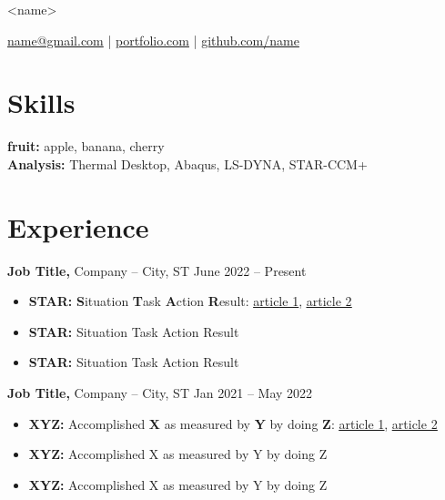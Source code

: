 \documentclass[11pt]{article}       %
\begin{document}
\centerline{\Huge <name>}

\vspace{5pt}

\centerline{\href{mailto:name@gmail.com}{name@gmail.com} | \href{https://mitcommlab.mit.edu/meche/commkit/portfolio/}{portfolio.com} | \href{https://old.reddit.com/r/EngineeringResumes/wiki/index\#wiki_portfolios}{github.com/name}}

\vspace{-10pt}

\section*{Skills}
\textbf{fruit:} apple, banana, cherry \\


\textbf{Analysis:} Thermal Desktop, Abaqus, LS-DYNA, STAR-CCM+

\vspace{-6.5pt}

\section*{Experience}
\textbf{Job Title,} {Company} -- City, ST \hfill June 2022 -- Present \\
\vspace{-9pt}
\begin{itemize}
  \item \textbf{STAR:} \textbf{S}ituation \textbf{T}ask \textbf{A}ction \textbf{R}esult: \href{https://www.levels.fyi/blog/applying-star-method-resumes.html}{\underline{article 1}}, \href{https://resumegenius.com/blog/resume-help/star-method-resume}{\underline{article 2}}
  \item \textbf{STAR:} Situation Task Action Result
  \item \textbf{STAR:} Situation Task Action Result
\end{itemize}

\textbf{Job Title,} {Company} -- City, ST \hfill Jan 2021 -- May 2022 \\
\vspace{-9pt}
\begin{itemize}
  \item \textbf{XYZ:} Accomplished \textbf{X} as measured by \textbf{Y} by doing \textbf{Z}: \href{https://www.inc.com/bill-murphy-jr/google-recruiters-say-these-5-resume-tips-including-x-y-z-formula-will-improve-your-odds-of-getting-hired-at-google.html}{\underline{article 1}}, \href{https://elevenrecruiting.com/create-an-effective-resume-xyz-resume-format/}{\underline{article 2}}
  \item \textbf{XYZ:} Accomplished X as measured by Y by doing Z
  \item \textbf{XYZ:} Accomplished X as measured by Y by doing Z
\end{itemize}
\end{document}
